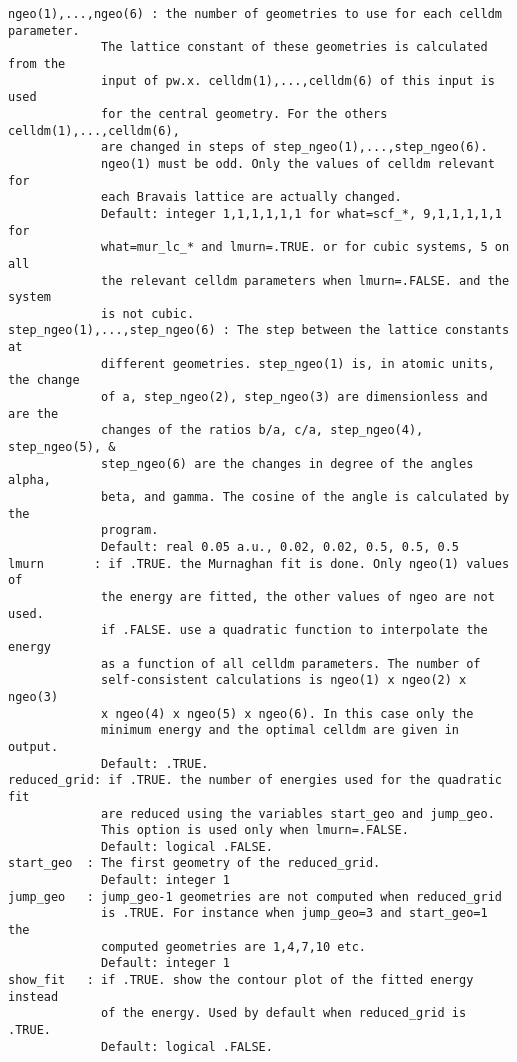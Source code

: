 \documentclass[12pt,a4paper]{article}
\begin{document}
\begin{verbatim}
ngeo(1),...,ngeo(6) : the number of geometries to use for each celldm parameter.
             The lattice constant of these geometries is calculated from the
             input of pw.x. celldm(1),...,celldm(6) of this input is used 
             for the central geometry. For the others celldm(1),...,celldm(6),
             are changed in steps of step_ngeo(1),...,step_ngeo(6). 
             ngeo(1) must be odd. Only the values of celldm relevant for
             each Bravais lattice are actually changed.
             Default: integer 1,1,1,1,1,1 for what=scf_*, 9,1,1,1,1,1 for 
             what=mur_lc_* and lmurn=.TRUE. or for cubic systems, 5 on all 
             the relevant celldm parameters when lmurn=.FALSE. and the system
             is not cubic.
step_ngeo(1),...,step_ngeo(6) : The step between the lattice constants at 
             different geometries. step_ngeo(1) is, in atomic units, the change
             of a, step_ngeo(2), step_ngeo(3) are dimensionless and are the
             changes of the ratios b/a, c/a, step_ngeo(4), step_ngeo(5), &
             step_ngeo(6) are the changes in degree of the angles alpha,
             beta, and gamma. The cosine of the angle is calculated by the
             program.
             Default: real 0.05 a.u., 0.02, 0.02, 0.5, 0.5, 0.5
lmurn       : if .TRUE. the Murnaghan fit is done. Only ngeo(1) values of
             the energy are fitted, the other values of ngeo are not used. 
             if .FALSE. use a quadratic function to interpolate the energy 
             as a function of all celldm parameters. The number of 
             self-consistent calculations is ngeo(1) x ngeo(2) x ngeo(3)
             x ngeo(4) x ngeo(5) x ngeo(6). In this case only the 
             minimum energy and the optimal celldm are given in output. 
             Default: .TRUE. 
reduced_grid: if .TRUE. the number of energies used for the quadratic fit 
             are reduced using the variables start_geo and jump_geo. 
             This option is used only when lmurn=.FALSE.
             Default: logical .FALSE.
start_geo  : The first geometry of the reduced_grid.
             Default: integer 1
jump_geo   : jump_geo-1 geometries are not computed when reduced_grid
             is .TRUE. For instance when jump_geo=3 and start_geo=1 the
             computed geometries are 1,4,7,10 etc.
             Default: integer 1
show_fit   : if .TRUE. show the contour plot of the fitted energy instead
             of the energy. Used by default when reduced_grid is .TRUE.
             Default: logical .FALSE.

\end{verbatim}
\end{document}
